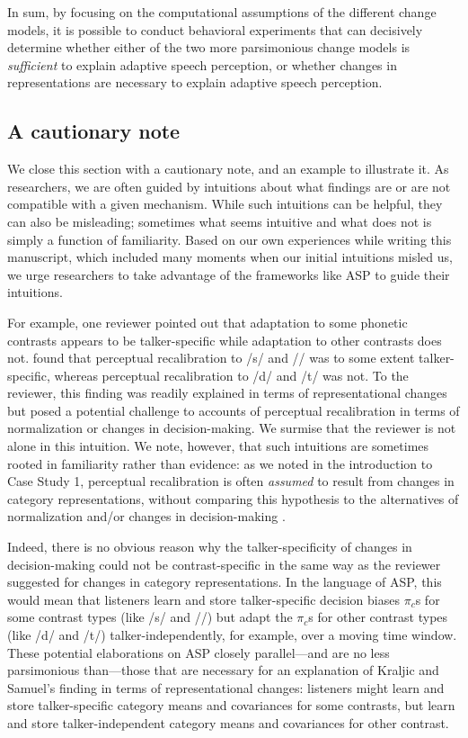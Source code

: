\documentclass[
  11pt,
  man,floatsintext]{apa6}
\begin{document}
In sum, by focusing on the computational assumptions of the different change models, it is possible to conduct behavioral experiments that can decisively determine whether either of the two more parsimonious change models is \emph{sufficient} to explain adaptive speech perception, or whether changes in representations are necessary to explain adaptive speech perception.

\subsection{A cautionary note}\label{sec:cautionary-note}

We close this section with a cautionary note, and an example to illustrate it. As researchers, we are often guided by intuitions about what findings are or are not compatible with a given mechanism. While such intuitions can be helpful, they can also be misleading; sometimes what seems intuitive and what does not is simply a function of familiarity. Based on our own experiences while writing this manuscript, which included many moments when our initial intuitions misled us, we urge researchers to take advantage of the frameworks like ASP to guide their intuitions.

For example, one reviewer pointed out that adaptation to some phonetic contrasts appears to be talker-specific while adaptation to other contrasts does not. \textcite{kraljic-samuel2007} found that perceptual recalibration to /s/ and // was to some extent talker-specific, whereas perceptual recalibration to /d/ and /t/ was not. To the reviewer, this finding was readily explained in terms of representational changes but posed a potential challenge to accounts of perceptual recalibration in terms of normalization or changes in decision-making. We surmise that the reviewer is not alone in this intuition. We note, however, that such intuitions are sometimes rooted in familiarity rather than evidence: as we noted in the introduction to Case Study 1, perceptual recalibration is often \emph{assumed} to result from changes in category representations, without comparing this hypothesis to the alternatives of normalization and/or changes in decision-making \autocite[for related discussion, see also][]{zheng-samuel2020}.

Indeed, there is no obvious reason why the talker-specificity of changes in decision-making could not be contrast-specific in the same way as the reviewer suggested for changes in category representations. In the language of ASP, this would mean that listeners learn and store talker-specific decision biases \(\pi_c\)s for some contrast types (like /s/ and //) but adapt the \(\pi_c\)s for other contrast types (like /d/ and /t/) talker-independently, for example, over a moving time window. These potential elaborations on ASP closely parallel---and are no less parsimonious than---those that are necessary for an explanation of Kraljic and Samuel's finding in terms of representational changes: listeners might learn and store talker-specific category means and covariances for some contrasts, but learn and store talker-independent category means and covariances for other contrast.
\end{document}
